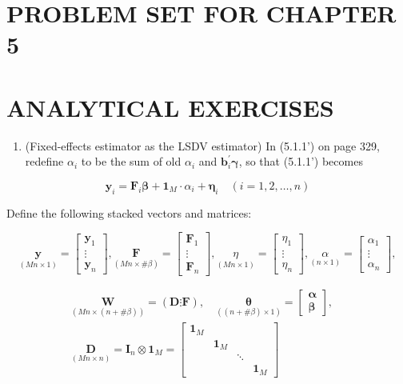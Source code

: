 \documentclass[10pt]{article}
\begin{document}
\section*{PROBLEM SET FOR CHAPTER 5}
\section*{ANALYTICAL EXERCISES}
\begin{enumerate}
  \item (Fixed-effects estimator as the LSDV estimator) In (5.1.1') on page 329, redefine $\alpha_{i}$ to be the sum of old $\alpha_{i}$ and $\mathbf{b}_{i}^{\prime} \boldsymbol{\gamma}$, so that (5.1.1') becomes
\end{enumerate}


\begin{equation*}
\mathbf{y}_{i}=\mathbf{F}_{i} \boldsymbol{\beta}+\mathbf{1}_{M} \cdot \alpha_{i}+\boldsymbol{\eta}_{i} \quad(i=1,2, \ldots, n) \tag{1}
\end{equation*}


Define the following stacked vectors and matrices:

$$
\underset{(M n \times 1)}{\mathbf{y}}=\left[\begin{array}{c}
\mathbf{y}_{1} \\
\vdots \\
\mathbf{y}_{n}
\end{array}\right], \underset{(M n \times \# \beta)}{\mathbf{F}}=\left[\begin{array}{c}
\mathbf{F}_{1} \\
\vdots \\
\mathbf{F}_{n}
\end{array}\right], \underset{(M n \times 1)}{\eta}=\left[\begin{array}{c}
\eta_{1} \\
\vdots \\
\eta_{n}
\end{array}\right], \underset{(n \times 1)}{\alpha}=\left[\begin{array}{c}
\alpha_{1} \\
\vdots \\
\alpha_{n}
\end{array}\right],
$$


\begin{gather*}
\underset{(M n \times(n+\# \beta))}{\mathbf{W}}=(\mathbf{D} \vdots \mathbf{F}), \quad \underset{((n+\# \beta) \times 1)}{\boldsymbol{\theta}}=\left[\begin{array}{l}
\boldsymbol{\alpha} \\
\boldsymbol{\beta}
\end{array}\right], \quad \\
\underset{(M n \times n)}{\mathbf{D}}=\mathbf{I}_{n} \otimes \mathbf{1}_{M}=\left[\begin{array}{llll}
\mathbf{1}_{M} & & & \\
& \mathbf{1}_{M} & & \\
& & \ddots & \\
& & & \mathbf{1}_{M}
\end{array}\right] \tag{2}
\end{gather*}
\end{document}
